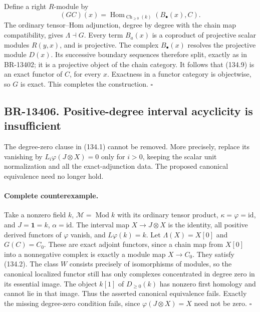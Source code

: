 \documentclass[11pt,a4paper]{article}
\theoremstyle{definition}\newtheorem{definition}[theorem]{Definition}
\theoremstyle{remark}\newtheorem{remark}[theorem]{Remark}
\begin{document}
Define a right \(R\)-module by
\[
 (GC)(x)=\operatorname{Hom}_{\operatorname{Ch}_{\geq0}(k)}
                    (B_\bullet(x),C).
 \tag{134.9}
\]
The ordinary tensor--Hom adjunction, degree by degree with the chain
map compatibility, gives \(\Lambda\dashv G\).  Every term
\(B_a(x)\) is a coproduct of projective scalar modules \(R(y,x)\),
and is projective.  The complex \(B_\bullet(x)\) resolves the
projective module \(D(x)\).  Its successive boundary sequences
therefore split, exactly as in BR-13402; it is a projective object of
the chain category.  It follows that (134.9) is an exact functor of
\(C\), for every \(x\).  Exactness in a functor category is
objectwise, so \(G\) is exact.  This completes the construction.
\(\square\)

\subsection{BR-13406. Positive-degree interval acyclicity is insufficient}
The degree-zero clause in (134.1) cannot be removed.  More precisely,
replace its vanishing by
\(L_i\varphi(J\otimes X)=0\) only for \(i>0\), keeping the scalar
unit normalization and all the exact-adjunction data.  The proposed
canonical equivalence need no longer hold.

\paragraph{Complete counterexample.}
Take a nonzero field \(k\), \(\mathcal M=\operatorname{Mod}k\)
with its ordinary tensor product, \(\kappa=\varphi=\mathrm{id}\),
and \(J=\mathbf1=k\), \(\alpha=\mathrm{id}\).  The interval map
\(X\to J\otimes X\) is the identity, all positive derived functors
of \(\varphi\) vanish, and \(L\varphi(k)=k\).  Let
\(\Lambda(X)=X[0]\) and \(G(C)=C_0\).  These are exact adjoint
functors, since a chain map from \(X[0]\) into a nonnegative complex
is exactly a module map \(X\to C_0\).  They satisfy (134.2).
The class \(W\) consists precisely of isomorphisms of modules, so
the canonical localized functor still has only complexes concentrated
in degree zero in its essential image.  The object \(k[1]\) of
\(D_{\geq0}(k)\) has nonzero first homology and cannot lie in that
image.  Thus the asserted canonical equivalence fails.  Exactly the
missing degree-zero condition fails, since
\(\varphi(J\otimes X)=X\) need not be zero. \(\square\)
\end{document}
